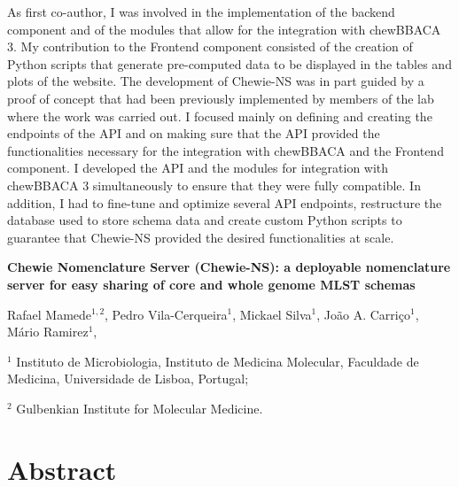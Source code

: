 As first co-author, I was involved in the implementation of the backend component and of the modules that allow for the integration with chewBBACA 3. My contribution to the Frontend component consisted of the creation of Python scripts that generate pre-computed data to be displayed in the tables and plots of the website. The development of \ac{Chewie-NS} was in part guided by a proof of concept that had been previously implemented by members of the lab where the work was carried out. I focused mainly on defining and creating the endpoints of the \ac{API} and on making sure that the \ac{API} provided the functionalities necessary for the integration with chewBBACA and the Frontend component. I developed the \ac{API} and the modules for integration with chewBBACA 3 simultaneously to ensure that they were fully compatible. In addition, I had to fine-tune and optimize several \ac{API} endpoints, restructure the database used to store schema data and create custom Python scripts to guarantee that \ac{Chewie-NS} provided the desired functionalities at scale.

\newpage

\begin{center}
\large
\textbf{Chewie Nomenclature Server (Chewie-NS): a deployable nomenclature server for easy sharing of core and whole genome MLST schemas}
\end{center}

Rafael Mamede$^{1,2}$, 
Pedro Vila-Cerqueira$^1$, 
Mickael Silva$^1$,
João A. Carriço$^1$,
Mário Ramirez$^1$,

$^1$ Instituto de Microbiologia, Instituto de Medicina Molecular, Faculdade de Medicina, Universidade de Lisboa, Portugal;

$^2$ Gulbenkian Institute for Molecular Medicine.

\section{Abstract} \label{sec:ch3_abstract}

